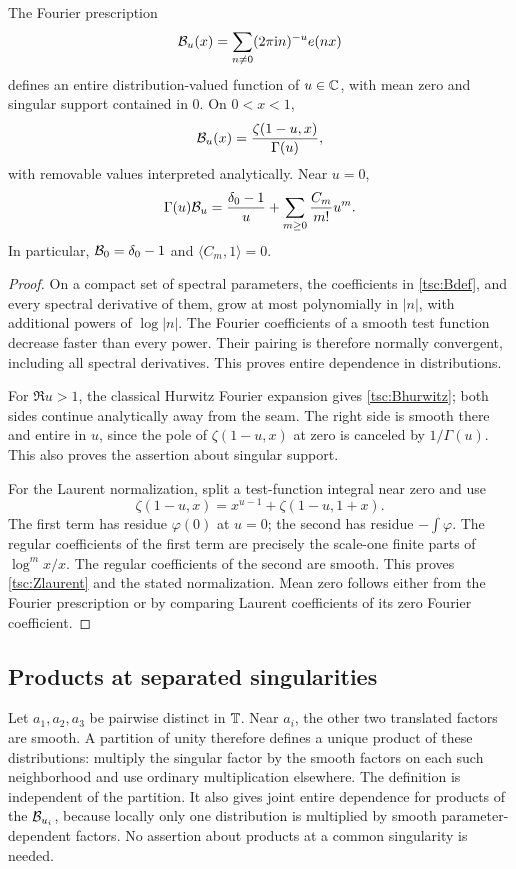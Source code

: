 \begin{lemma}\label{tsc:entire-B}
The Fourier prescription
\begin{equation}\label{tsc:Bdef}
 \mathcal B_u(x)=\sum_{n\ne0}(2\pi\mathrm i n)^{-u}e(nx)
\end{equation}
defines an entire distribution-valued function of $u\in\mathbb C$, with mean
zero and singular support contained in $0$. On $0<x<1$,
\begin{equation}\label{tsc:Bhurwitz}
 \mathcal B_u(x)=\frac{\zeta(1-u,x)}{\Gamma(u)},
\end{equation}
with removable values interpreted analytically. Near $u=0$,
\begin{equation}\label{tsc:Zlaurent}
 \Gamma(u)\mathcal B_u=\frac{\delta_0-1}{u}
          +\sum_{m\ge0}\frac{C_m}{m!}u^m.
\end{equation}
In particular, $\mathcal B_0=\delta_0-1$ and $\langle C_m,1\rangle=0$.
\end{lemma}
\begin{proof}
On a compact set of spectral parameters, the coefficients in
\eqref{tsc:Bdef}, and every spectral derivative of them, grow at most
polynomially in $|n|$, with additional powers of $\log|n|$. The Fourier
coefficients of a smooth test function decrease faster than every power.
Their pairing is therefore normally convergent, including all spectral
derivatives. This proves entire dependence in distributions.

For $\Re u>1$, the classical Hurwitz Fourier expansion
\cite[Eq.~25.11.9]{tsc:dlmf-zeta} gives \eqref{tsc:Bhurwitz}; both sides
continue analytically away from the seam. The right side is smooth there
and entire in $u$, since the pole of $\zeta(1-u,x)$ at zero is canceled by
$1/\Gamma(u)$. This also proves the assertion about singular support.

For the Laurent normalization, split a test-function integral near zero
and use
\[
 \zeta(1-u,x)=x^{u-1}+\zeta(1-u,1+x).
\]
The first term has residue $\varphi(0)$ at $u=0$; the second has residue
$-\int\varphi$. The regular coefficients of the first term are precisely
the scale-one finite parts of $\log^m x/x$. The regular coefficients of
the second are smooth. This proves \eqref{tsc:Zlaurent} and the stated
normalization. Mean zero follows either from the Fourier prescription or
by comparing Laurent coefficients of its zero Fourier coefficient.
\end{proof}

\subsection{Products at separated singularities}
Let $a_1,a_2,a_3$ be pairwise distinct in $\mathbb T$. Near $a_i$, the other two
translated factors are smooth. A partition of unity therefore defines a
unique product of these distributions: multiply the singular factor by the
smooth factors on each such neighborhood and use ordinary multiplication
elsewhere. The definition is independent of the partition. It also gives
joint entire dependence for products of the $\mathcal B_{u_i}$, because locally
only one distribution is multiplied by smooth parameter-dependent factors.
No assertion about products at a common singularity is needed.


